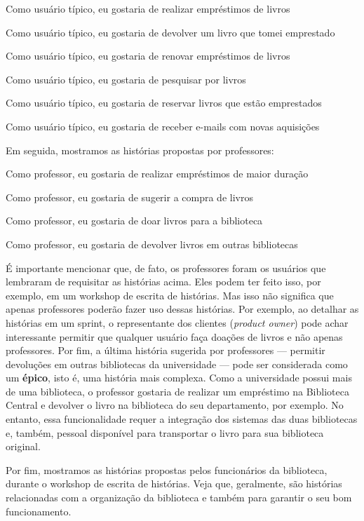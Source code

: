 \documentclass[
  11pt,
  twoside]{book}
\renewenvironment{quote}{\centering \vspace{1.5ex} \begin{tcolorbox}[colback=backcolor, width=4.9in]}{\end{tcolorbox}}
\begin{document}
\begin{quote}
Como usuário típico, eu gostaria de realizar empréstimos de livros

Como usuário típico, eu gostaria de devolver um livro que tomei
emprestado

Como usuário típico, eu gostaria de renovar empréstimos de livros

Como usuário típico, eu gostaria de pesquisar por livros

Como usuário típico, eu gostaria de reservar livros que estão
emprestados

Como usuário típico, eu gostaria de receber e-mails com novas aquisições
\end{quote}

Em seguida, mostramos as histórias propostas por professores:

\begin{quote}
Como professor, eu gostaria de realizar empréstimos de maior duração

Como professor, eu gostaria de sugerir a compra de livros

Como professor, eu gostaria de doar livros para a biblioteca

Como professor, eu gostaria de devolver livros em outras bibliotecas
\end{quote}

 É importante mencionar que, de fato,
os professores foram os usuários que lembraram de requisitar as
histórias acima. Eles podem ter feito isso, por exemplo, em um workshop
de escrita de histórias. Mas isso não significa que apenas professores
poderão fazer uso dessas histórias. Por exemplo, ao detalhar as
histórias em um sprint, o representante dos clientes (\emph{product
owner}) pode achar interessante permitir que qualquer usuário faça
doações de livros e não apenas professores. Por fim, a última história
sugerida por professores --- permitir devoluções em outras bibliotecas
da universidade --- pode ser considerada como um \textbf{épico}, isto é,
uma história mais complexa. Como a universidade possui mais de uma
biblioteca, o professor gostaria de realizar um empréstimo na Biblioteca
Central e devolver o livro na biblioteca do seu departamento, por
exemplo. No entanto, essa funcionalidade requer a integração dos
sistemas das duas bibliotecas e, também, pessoal disponível para
transportar o livro para sua biblioteca original.

Por fim, mostramos as histórias propostas pelos funcionários da
biblioteca, durante o workshop de escrita de histórias. Veja que,
geralmente, são histórias relacionadas com a organização da biblioteca e
também para garantir o seu bom funcionamento.
\end{document}
